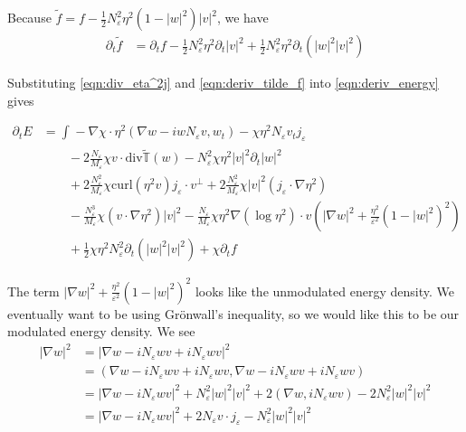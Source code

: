 \documentclass[a4paper]{article}
\newcommand{\curl}{\mathrm{curl}}
\renewcommand{\div}{\mathrm{div}}
\begin{document}
Because $\tilde{f} = f - \frac{1}{2} N_\varepsilon^2 \eta^2 (1-|w|^2)|v|^2$, we have
\begin{align}
  \partial_t \tilde{f} &= \partial_t f - \frac{1}{2} N_\varepsilon^2 \eta^2 \partial_t |v|^2 + \frac{1}{2} N_\varepsilon^2 \eta^2 \partial_t ( |w|^2
  |v|^2 )
  \label{eqn:deriv_tilde_f}
\end{align}

Substituting \eqref{eqn:div_eta^2j} and \eqref{eqn:deriv_tilde_f} into \eqref{eqn:deriv_energy} gives

\begin{align}
  \partial_t E &= \int_{}^{} -\nabla \chi \cdot \eta^2 ( \nabla w - i w N_\varepsilon v, w_t) - \chi \eta^2 N_\varepsilon v_t j_\varepsilon \nonumber
  \\
  &\quad \quad -2 \frac{N_\varepsilon}{M_\varepsilon} \chi v \cdot \div \tilde{\mathbb{T}}(w) -
  N_\varepsilon^2 \chi \eta^2 |v|^2 \partial_t |w|^2  \nonumber \\
  &\quad \quad+ 2 \frac{N_\varepsilon^2}{M_\varepsilon} \chi \curl(\eta^2 v) j_\varepsilon \cdot v^\perp + 2 \frac{N_\varepsilon^2}{M_\varepsilon} \chi
  |v|^2 (j_\varepsilon \cdot \nabla \eta^2) \nonumber \\
  &\quad \quad - \frac{N_\varepsilon^3}{M_\varepsilon} \chi (v \cdot \nabla \eta^2) |v|^2 - \frac{N_\varepsilon}{M_\varepsilon} \chi \eta^2 \nabla(
  \log \eta^2 ) \cdot v \left( | \nabla w |^2 + \frac{\eta^2}{\varepsilon^2} (1-|w|^2)^2 \right) \nonumber \\
  &\quad \quad + \frac{1}{2} \chi \eta^2 N_\varepsilon^2 \partial_t (|w|^2 |v|^2) + \chi \partial_t f
  \label{eqn:deriv_energy2}
\end{align}

The term $| \nabla w |^2 + \frac{\eta^2}{\varepsilon^2} (1-|w|^2)^2$ looks like the unmodulated energy density. We eventually want to be using
Gr\"{o}nwall's inequality, so we would like this to be our modulated energy density. We see
\begin{align}
  | \nabla w |^2 &= | \nabla w - i N_\varepsilon w v + i N_\varepsilon w v |^2 \nonumber \\
  &= ( \nabla w - i N_\varepsilon w v + i N_\varepsilon w v , \nabla w - i N_\varepsilon wv + i N_\varepsilon wv ) \nonumber \\
  &= | \nabla w - i N_\varepsilon w v |^2 + N_\varepsilon^2 |w|^2 |v|^2 + 2 ( \nabla w, i N_\varepsilon w v) - 2 N_\varepsilon^2 |w|^2 |v|^2 \nonumber
  \\
  &= | \nabla w - i N_\varepsilon w v |^2 + 2 N_\varepsilon v \cdot j_\varepsilon - N_\varepsilon^2 |w|^2 |v|^2
  \label{eqn:nabla_w}
\end{align}
\end{document}
